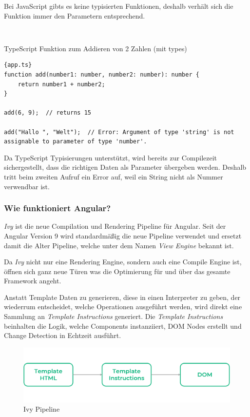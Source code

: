 Bei JavaScript gibts es keine typisierten Funktionen, deshalb verhält sich die Funktion immer den Parametern entsprechend.

\

TypeScript Funktion zum Addieren von 2 Zahlen (mit types)
\begin{lstlisting}[label={lst:add-function-ts}]{app.ts}
function add(number1: number, number2: number): number {
    return number1 + number2;
}

add(6, 9);  // returns 15

add("Hallo ", "Welt");  // Error: Argument of type 'string' is not assignable to parameter of type 'number'.
\end{lstlisting}

Da TypeScript Typisierungen unterstützt, wird bereits zur Compilezeit sichergestellt, dass die richtigen Daten als Parameter übergeben werden.
Deshalb tritt beim zweiten Aufruf ein Error auf, weil ein String nicht als Nummer verwendbar ist.

\cite{typescript-landing-page, what-is-typescript}

\subsubsection{Wie funktioniert Angular?}
\emph{Ivy} ist die neue Compilation und Rendering Pipeline für Angular.
Seit der Angular Version 9 wird standardmäßig die neue Pipeline verwendet und ersetzt damit die Alter Pipeline,
welche unter dem Namen \emph{View Engine} bekannt ist.

Da \emph{Ivy} nicht nur eine Rendering Engine, sondern auch eine Compile Engine ist, öffnen sich ganz neue Türen was die
Optimierung für und über das gesamte Framework angeht.

Anstatt Template Daten zu generieren, diese in einen Interpreter zu geben, der wiederrum entscheidet, welche Operationen
ausgeführt werden, wird direkt eine Sammlung an \emph{Template Instructions} generiert.
Die \emph{Template Instructions} beinhalten die Logik, welche Components instanziiert, DOM Nodes erstellt und Change Detection in Echtzeit ausführt.

\begin{figure}[hbt!]
    \centering
    \includegraphics[scale=.4]{pics/ivy-pipeline}
    \caption{Ivy Pipeline}
    \label{fig:ivy-pipeline}
\end{figure}

